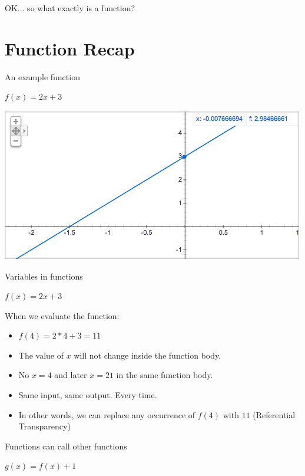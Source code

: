 \documentclass{beamer}
\begin{document}
\begin{frame}{}
OK... so what exactly is a function?
\end{frame}

\section{Function Recap}

\begin{frame}{An example function}

  {\Huge $f(x) = 2x + 3$}

  \includegraphics[scale=0.5]{img/fx2x3.png}

\end{frame}

\begin{frame}{Variables in functions}

  {\Huge $f(x) = 2x + 3$}

  \vskip5mm

When we evaluate the function:
  \begin{itemize}[<+->]
    \item $f(4) = 2*4 + 3 = 11$
    \item The value of $x$ will not change inside the function body.
    \item No $x = 4$ and later $x = 21$ in the same function body.
    \item Same input, same output. Every time.
    \item In other words, we can replace any occurrence of $f(4)$ with
      $11$ (Referential Transparency)
  \end{itemize}
\end{frame}


\begin{frame}{Functions can call other functions}

  {\Huge $g(x) = f(x) + 1$}

\end{frame}
\end{document}
